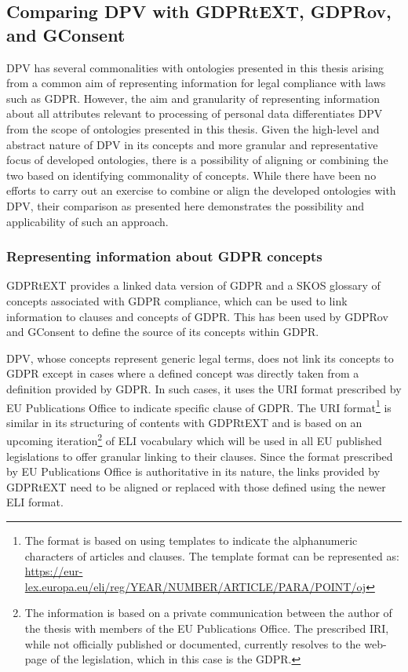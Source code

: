 \subsection{Comparing DPV with GDPRtEXT, GDPRov, and GConsent}
DPV has several commonalities with ontologies presented in this thesis arising from a common aim of representing information for legal compliance with laws such as GDPR.
However, the aim and granularity of representing information about all attributes relevant to processing of personal data differentiates DPV from the scope of ontologies presented in this thesis.
Given the high-level and abstract nature of DPV in its concepts and more granular and representative focus of developed ontologies, there is a possibility of aligning or combining the two based on identifying commonality of concepts.
While there have been no efforts to carry out an exercise to combine or align the developed ontologies with DPV, their comparison as presented here demonstrates the possibility and applicability of such an approach.

\subsubsection{Representing information about GDPR concepts}
GDPRtEXT provides a linked data version of GDPR and a SKOS glossary of concepts associated with GDPR compliance, which can be used to link information to clauses and concepts of GDPR.
This has been used by GDPRov and GConsent to define the source of its concepts within GDPR.

DPV, whose concepts represent generic legal terms, does not link its concepts to GDPR except in cases where a defined concept was directly taken from a definition provided by GDPR.
In such cases, it uses the URI format prescribed by EU Publications Office to indicate specific clause of GDPR. The URI format\footnote{The format is based on using templates to indicate the alphanumeric characters of articles and clauses. The template format can be represented as: \url{https://eur-lex.europa.eu/eli/reg/YEAR/NUMBER/ARTICLE/PARA/POINT/oj}} is similar in its structuring of contents with GDPRtEXT and is based on an upcoming iteration\footnote{The information is based on a private communication between the author of the thesis with members of the EU Publications Office. The prescribed IRI, while not officially published or documented, currently resolves to the web-page of the legislation, which in this case is the GDPR.} of ELI vocabulary which will be used in all EU published legislations to offer granular linking to their clauses.
Since the format prescribed by EU Publications Office is authoritative in its nature, the links provided by GDPRtEXT need to be aligned or replaced with those defined using the newer ELI format.

